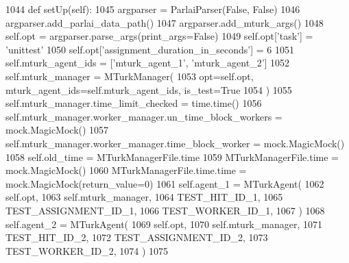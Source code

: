 \begin{DoxyCode}
1044     \textcolor{keyword}{def }setUp(self):
1045         argparser = ParlaiParser(\textcolor{keyword}{False}, \textcolor{keyword}{False})
1046         argparser.add\_parlai\_data\_path()
1047         argparser.add\_mturk\_args()
1048         self.opt = argparser.parse\_args(print\_args=\textcolor{keyword}{False})
1049         self.opt[\textcolor{stringliteral}{'task'}] = \textcolor{stringliteral}{'unittest'}
1050         self.opt[\textcolor{stringliteral}{'assignment\_duration\_in\_seconds'}] = 6
1051         self.mturk\_agent\_ids = [\textcolor{stringliteral}{'mturk\_agent\_1'}, \textcolor{stringliteral}{'mturk\_agent\_2'}]
1052         self.mturk\_manager = MTurkManager(
1053             opt=self.opt, mturk\_agent\_ids=self.mturk\_agent\_ids, is\_test=\textcolor{keyword}{True}
1054         )
1055         self.mturk\_manager.time\_limit\_checked = time.time()
1056         self.mturk\_manager.worker\_manager.un\_time\_block\_workers = mock.MagicMock()
1057         self.mturk\_manager.worker\_manager.time\_block\_worker = mock.MagicMock()
1058         self.old\_time = MTurkManagerFile.time
1059         MTurkManagerFile.time = mock.MagicMock()
1060         MTurkManagerFile.time.time = mock.MagicMock(return\_value=0)
1061         self.agent\_1 = MTurkAgent(
1062             self.opt,
1063             self.mturk\_manager,
1064             TEST\_HIT\_ID\_1,
1065             TEST\_ASSIGNMENT\_ID\_1,
1066             TEST\_WORKER\_ID\_1,
1067         )
1068         self.agent\_2 = MTurkAgent(
1069             self.opt,
1070             self.mturk\_manager,
1071             TEST\_HIT\_ID\_2,
1072             TEST\_ASSIGNMENT\_ID\_2,
1073             TEST\_WORKER\_ID\_2,
1074         )
1075 
\end{DoxyCode}
\mbox{\label{classparlai_1_1mturk_1_1core_1_1test_1_1test__mturk__manager_1_1TestMTurkManagerTimeHandling_acf6005ca0388e649c75d4ae43638846a}} 
